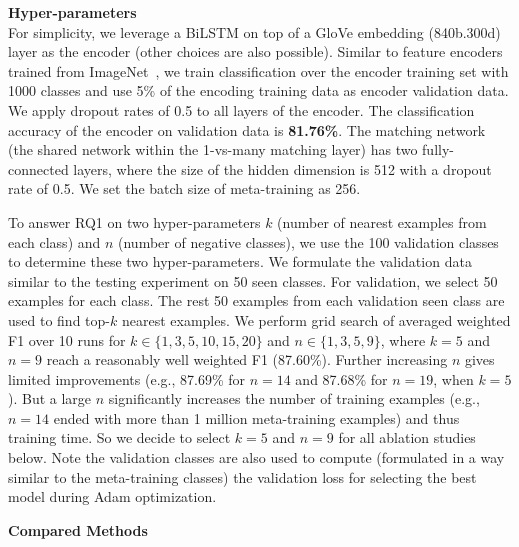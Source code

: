\textbf{Hyper-parameters}\\
For simplicity, we leverage a BiLSTM \cite{hochreiter1997long,schuster1997bidirectional} on top of a GloVe \cite{pennington2014glove} embedding (840b.300d) layer as the encoder (other choices are also possible).
Similar to feature encoders trained from ImageNet~\cite{russakovsky2015imagenet}, we train classification over the encoder training set with 1000 classes and use 5\% of the encoding training data as encoder validation data.
We apply dropout rates of 0.5 to all layers of the encoder. 
The classification accuracy of the encoder on validation data is \textbf{81.76\%}.
The matching network (the shared network within the 1-vs-many matching layer) has two fully-connected layers, where the size of the hidden dimension is 512 with a dropout rate of 0.5.
We set the batch size of meta-training as 256.

To answer RQ1 on two hyper-parameters $k$ (number of nearest examples from each class) and $n$ (number of negative classes), we use the 100 validation classes to determine these two hyper-parameters.
We formulate the validation data similar to the testing experiment on 50 seen classes.
For validation, we select 50 examples for each class. The rest 50 examples from each validation seen class are used to find top-$k$ nearest examples.
We perform grid search of averaged weighted F1 over 10 runs for $k\in\{1, 3, 5, 10, 15, 20\}$ and $n\in \{1, 3, 5, 9\}$, where \textbf{$k=5$} and \textbf{$n=9$} reach a reasonably well weighted F1 (87.60\%). Further increasing $n$ gives limited improvements (e.g., 87.69\% for $n=14$ and 87.68\% for $n=19$, when $k=5$). But a large $n$ significantly increases the number of training examples (e.g., $n=14$ ended with more than 1 million meta-training examples) and thus training time. So we decide to select $k=5$ and $n=9$ for all ablation studies below.
Note the validation classes are also used to compute (formulated in a way similar to the meta-training classes) the validation loss for selecting the best model during Adam \cite{kingma2014adam} optimization.

\textbf{Compared Methods}\\

